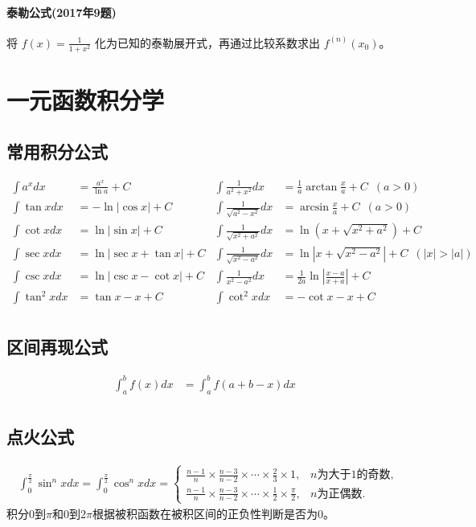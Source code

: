 ﻿\documentclass[a4paper,12pt,UTF8]{ctexart}
\begin{document}
    \paragraph{泰勒公式(2017年9题)}
    将 \(f(x)=\frac{1}{1+x^2}\) 化为已知的泰勒展开式，再通过比较系数求出 \(f^{(n)}(x_0)\)。

    \section{一元函数积分学}

    \subsection{常用积分公式}
    \begin{align*}
        \int {a}^{x} dx& = \frac{{a}^{x}}{\ln a}+C& \int \frac{1}{a^{2}+x^{2}}dx& = \frac{1}{a}\arctan\frac{x}{a}+C \enspace (a>0)&\\
        \int \tan x dx& = -\ln \left|\cos x \right|+C& \int \frac{1}{\sqrt{a^{2}-x^{2}}}dx& = \arcsin\frac{x}{a}+C \enspace (a>0)&\\
        \int \cot x dx& = \ln \left|\sin x \right|+C& \int \frac{1}{\sqrt{x^{2}+a^{2}}}dx& = \ln\left(x+\sqrt{x^{2}+a^{2}}\right)+C&\\
        \int \sec x dx& = \ln \left|\sec x + \tan x \right|+C& \int \frac{1}{\sqrt{x^{2}-a^{2}}}dx& = \ln\left|x+\sqrt{x^{2}-a^{2}}\right|+C \enspace (\left|x\right|>\left|a\right|)&\\
        \int \csc x dx& = \ln \left|\csc x - \cot x \right|+C& \int \frac{1}{x^{2}-a^{2}}dx& = \frac{1}{2a}\ln\left|\frac{x-a}{x+a}\right|+C&\\
        \int \tan^2 x dx& = \tan x-x+C& \int \cot^2 x dx& = -\cot x-x+C& \\
    \end{align*}

    \subsection{区间再现公式}
    \begin{align*}
        \int_{a}^{b}f(x)dx& = \int_{a}^{b}f(a+b-x)dx&\\
    \end{align*}
    
    \subsection{点火公式}
    \begin{align*}
        \int_{0}^{\frac{\pi}{2}} \sin^{n}x dx = \int_{0}^{\frac{\pi}{2}} \cos^{n}x dx =
        \begin{cases}
            \frac{n-1}{n} \times \frac{n-3}{n-2} \times \cdots \times \frac{2}{3} \times 1,& n \text{为大于} 1 \text{的奇数},\\
            \frac{n-1}{n} \times \frac{n-3}{n-2} \times \cdots \times \frac{1}{2} \times \frac{\pi}{2},& n \text{为正偶数}.
        \end{cases}
    \end{align*}
    积分0到\(\pi\)和0到\(2\pi\)根据被积函数在被积区间的正负性判断是否为0。
\end{document}
